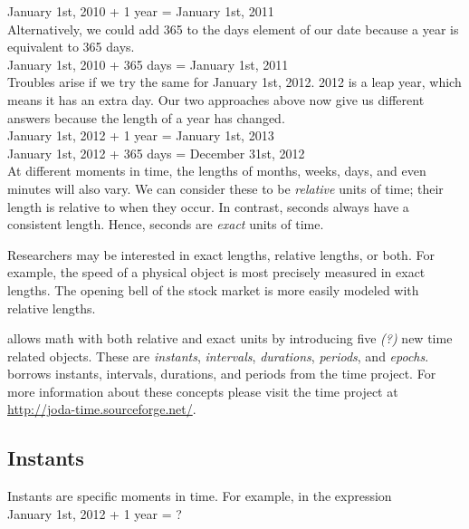 \documentclass[article]{jss}
\begin{document}
January 1st, 2010 + 1 year = January 1st, 2011\\

Alternatively, we could add 365 to the days element of our date because a year is equivalent to 365 days. \\

January 1st, 2010 + 365 days = January 1st, 2011\\

Troubles arise if we try the same for January 1st, 2012. 2012 is a leap year, which means it has an extra day. Our two approaches above now give us different answers because the length of a year has changed.\\ 

January 1st, 2012 + 1 year = January 1st, 2013\\
January 1st, 2012 + 365 days = December 31st,  2012\\

At different moments in time, the lengths of months, weeks, days, and even minutes will also vary. We can consider these to be \emph{relative} units of time; their length is relative to when they occur. In contrast, seconds always have a consistent length. Hence, seconds are \emph{exact} units of time.

Researchers may be interested in exact lengths, relative lengths, or both. For example, the speed of a physical object is most precisely measured in exact lengths. The opening bell of the stock market is more easily modeled with relative lengths.

 allows math with both relative and exact units by introducing five \emph{(?)} new time related objects. These are \emph{instants}, \emph{intervals}, \emph{durations}, \emph{periods}, and \emph{epochs}.   borrows instants, intervals, durations, and periods from the  time project. For more information about these concepts please visit the  time project at  \url{http://joda-time.sourceforge.net/}. 

\subsection{Instants}
\label{sec:instants}

Instants are specific moments in time.  For example, in the expression\\

January 1st, 2012 + 1 year = ?\\
\end{document}
